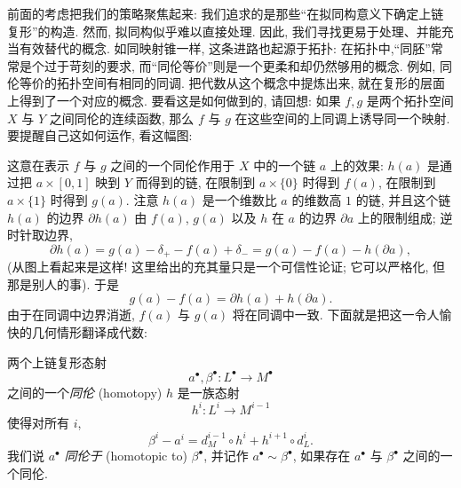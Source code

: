 前面的考虑把我们的策略聚焦起来: 我们追求的是那些``在拟同构意义下确定上链复形''的构造. 然而, 拟同构似乎难以直接处理. 因此, 我们寻找更易于处理、并能充当有效替代的概念.
如同映射锥一样, 这条进路也起源于拓扑: 在拓扑中,``同胚''常常是个过于苛刻的要求, 而``同伦等价''则是一个更柔和却仍然够用的概念. 例如, 同伦等价的拓扑空间有相同的同调. 把代数从这个概念中提炼出来, 就在复形的层面上得到了一个对应的概念.
要看这是如何做到的, 请回想: 如果 $f,g$ 是两个拓扑空间 $X$ 与 $Y$ 之间同伦的连续函数, 那么 $f$ 与 $g$ 在这些空间的上同调上诱导同一个映射. 要提醒自己这如何运作, 看这幅图:
\begin{center}
\end{center}
这意在表示 $f$ 与 $g$ 之间的一个同伦作用于 $X$ 中的一个链 $a$ 上的效果: $h(a)$ 是通过把 $a\times[0,1]$ 映到 $Y$ 而得到的链, 在限制到 $a\times\{0\}$ 时得到 $f(a)$, 在限制到 $a\times\{1\}$ 时得到 $g(a)$. 注意 $h(a)$ 是一个维数比 $a$ 的维数高 $1$ 的链, 并且这个链 $h(a)$ 的边界 $\partial h(a)$ 由 $f(a)$, $g(a)$ 以及 $h$ 在 $a$ 的边界 $\partial a$ 上的限制组成; 逆时针取边界,
\[
\partial h(a)=g(a)-\delta_+-f(a)+\delta_-=g(a)-f(a)-h(\partial a),
\]
(从图上看起来是这样! 这里给出的充其量只是一个可信性论证; 它可以严格化, 但那是别人的事).
于是
\[
g(a)-f(a)=\partial h(a)+h(\partial a).
\]
由于在同调中边界消逝, $f(a)$ 与 $g(a)$ 将在同调中一致.
下面就是把这一令人愉快的几何情形翻译成代数:

\begin{definition}\label{def:4.8-homotopy}
两个上链复形态射
\[
a^\bullet,\beta^\bullet:L^\bullet\to M^\bullet
\]
之间的一个\emph{同伦} (homotopy) $h$ 是一族态射
\[
h^i:L^i\to M^{i-1}
\]
使得对所有 $i$,
\[
\beta^i-a^i=d_M^{i-1}\circ h^i+h^{i+1}\circ d_L^i.
\]
我们说 $a^\bullet$ \emph{同伦于} (homotopic to) $\beta^\bullet$, 并记作 $a^\bullet\sim\beta^\bullet$, 如果存在 $a^\bullet$ 与 $\beta^\bullet$ 之间的一个同伦.
\end{definition}

